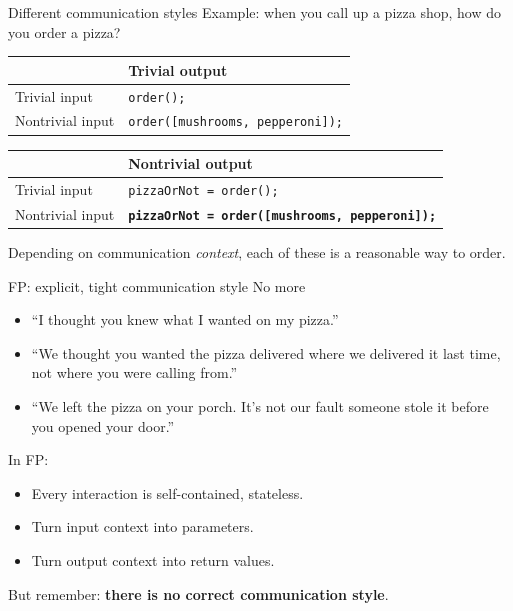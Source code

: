\begin{frame}[fragile]{Different communication styles}
  Example: when you call up a pizza shop, how do you order a pizza?

  \begin{table}
    \begin{tabular}{| l || l |}
      \toprule
      & Trivial output \\
      \midrule
      Trivial input
      & \texttt{order();} \\
      Nontrivial input
      & \texttt{order([mushrooms, pepperoni]);} \\
      \bottomrule
    \end{tabular}
  \end{table}

  \begin{table}
    \begin{tabular}{| l || l |}
      \toprule
      & Nontrivial output \\
      \midrule
      Trivial input
      & \texttt{pizzaOrNot = order();} \\
      Nontrivial input
      & \textbf{\texttt{pizzaOrNot = order([mushrooms, pepperoni]);}} \\
      \bottomrule
    \end{tabular}
  \end{table}

  Depending on communication \emph{context}, each of these is
  a reasonable way to order.
\end{frame}

\begin{frame}{FP: explicit, tight communication style}
  No more
  \begin{itemize}
  \item ``I thought you knew what I wanted on my pizza.''
  \item ``We thought you wanted the pizza delivered where we delivered
    it last time, not where you were calling from.''
\item ``We left the pizza on your porch. It's not our fault someone
  stole it before you opened your door.''
  \end{itemize}

  In FP:
  \begin{itemize}
  \item Every interaction is self-contained, stateless.
  \item Turn input context into parameters.
  \item Turn output context into return values.
  \end{itemize}

  But remember: \textbf{there is no correct communication style}.
\end{frame}

